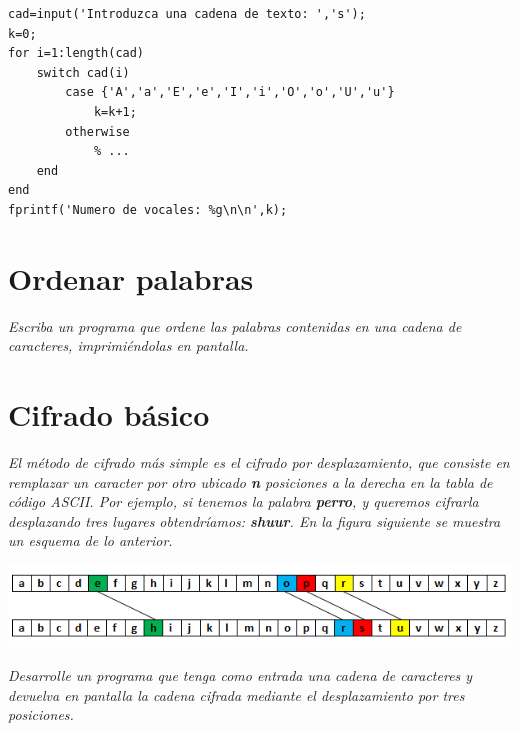 \begin{verbatim}
cad=input('Introduzca una cadena de texto: ','s');
k=0;
for i=1:length(cad)
    switch cad(i)
        case {'A','a','E','e','I','i','O','o','U','u'}
            k=k+1;
        otherwise
            % ...
    end
end
fprintf('Numero de vocales: %g\n\n',k);
\end{verbatim}


\section{Ordenar palabras}

\textit{Escriba un programa que ordene las palabras contenidas en una cadena de caracteres, imprimiéndolas en pantalla.}

\sol



\section{Cifrado básico}

\textit{El método de cifrado más simple es el cifrado por desplazamiento, que consiste en remplazar un caracter 
por otro ubicado {\bf n} posiciones a la derecha en la tabla de código ASCII. Por ejemplo, si tenemos la palabra 
{\bf perro}, y queremos cifrarla desplazando tres lugares obtendríamos: {\bf shuur}. En la figura siguiente se muestra 
un esquema de lo anterior.}

\begin{center}
\includegraphics[scale=0.8]{src/cifrado.png}
\end{center}

\textit{Desarrolle un programa que tenga como entrada una cadena de caracteres y devuelva en pantalla 
la cadena cifrada mediante el desplazamiento por tres posiciones.}


